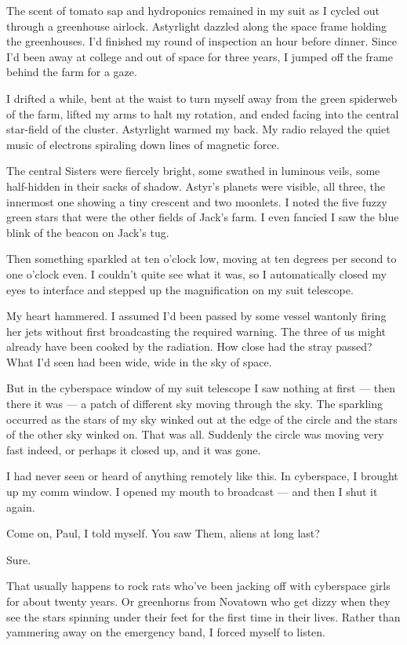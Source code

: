 \documentclass[english,11pt,letterpaper,onecolumn]{scrbook}
\begin{document}
	The scent of tomato sap and hydroponics remained in my suit as I cycled out through a greenhouse airlock.  Astyrlight dazzled along the space frame holding the greenhouses.  I'd finished my round of inspection an hour before dinner.  Since I'd been away at college and out of space for three years, I jumped off the frame behind the farm for a gaze.

	I drifted a while, bent at the waist to turn myself away from the green spiderweb of the farm, lifted my arms to halt my rotation, and ended facing into the central star-field of the cluster.  Astyrlight warmed my back.  My radio relayed the quiet music of electrons spiraling down lines of magnetic force.  

	The central Sisters were fiercely bright, some swathed in luminous veils, some half-hidden in their sacks of shadow.  Astyr's planets were visible, all three, the innermost one showing a tiny crescent and two moonlets.  I noted the five fuzzy green stars that were the other fields of Jack's farm.  I even fancied I saw the blue blink of the beacon on Jack's tug.

	Then something sparkled at ten o'clock low, moving at ten degrees per 
second to one o'clock even.  I couldn't quite see what it was, so I 
automatically closed my eyes to interface and stepped up the magnification on 
my suit telescope.

	My heart hammered.  I assumed I'd been passed by some vessel wantonly firing her jets without first broadcasting the required warning.  The three of us might already have been cooked by the radiation.  How close had the stray passed?  What I'd seen had been wide, wide in the sky of space.  

	But in the cyberspace window of my suit telescope I saw nothing at first --- then there it was --- a patch of different sky moving through the sky.  The sparkling occurred as the stars of my sky winked out at the edge of the circle and the stars of the other sky winked on.  That was all.  Suddenly the circle was moving very fast indeed, or perhaps it closed up, and it was gone.  

	I had never seen or heard of anything remotely like this.  In cyberspace, I brought up my comm window.  I opened my mouth to broadcast --- and then I shut it again.

	Come on, Paul, I told myself.  You saw Them, aliens at long last?  

	Sure.  

	That usually happens to rock rats who've been jacking off with cyberspace girls for about twenty years.  Or greenhorns from Novatown who get dizzy when they see the stars spinning under their feet for the first time in their lives.  Rather than yammering away on the emergency band, I forced myself to listen.  
\end{document}
